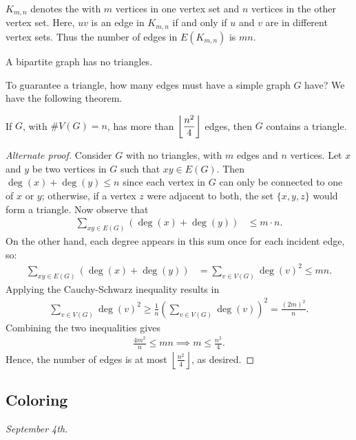 $K_{m,n}$ denotes the  with $m$ vertices in one vertex set and $n$ vertices in the other vertex set. Here, $uv$ is an edge in $K_{m,n}$ if and only if $u$ and $v$ are in different vertex sets. Thus the number of edges in $E(K_{m,n})$ is $mn$.

\begin{corollary}
    A bipartite graph has no triangles.
\end{corollary}

To guarantee a triangle, how many edges must have a simple graph $G$ have? We have the following theorem.

\begin{theorem}
    If $G$, with $\#V(G) = n$, has more than $\left\lfloor \dfrac{n^{2}}{4} \right\rfloor$ edges, then $G$ contains a triangle.
\end{theorem}

\begin{proof}[Alternate proof]
    Consider $G$ with no triangles, with $m$ edges and $n$ vertices. Let $x$ and $y$ be two vertices in $G$ such that $xy \in E(G)$. Then $\deg(x) + \deg(y) \leq n$ since each vertex in $G$ can only be connected to one of $x$ or $y$; otherwise, if a vertex $z$ were adjacent to both, the set $\{x, y, z\}$ would form a triangle. Now observe that
    \begin{align}
        \sum_{xy \in E(G)} \left( \deg(x) + \deg(y) \right) &\leq m \cdot n.
    \end{align}
    On the other hand, each degree appears in this sum once for each incident edge, so:
    \begin{align}
        \sum_{xy \in E(G)} \left( \deg(x) + \deg(y) \right) &= \sum_{v \in V(G)} \deg(v)^2 \leq mn.
    \end{align}
    Applying the Cauchy-Schwarz inequality results in
    \begin{align}
        \sum_{v \in V(G)} \deg(v)^2 \geq \frac{1}{n} \left( \sum_{v \in V(G)} \deg(v) \right)^2 = \frac{(2m)^2}{n}.
    \end{align}
    Combining the two inequalities gives
    \begin{align}
        \frac{4m^2}{n} \leq m n \implies m \leq \frac{n^2}{4}.
    \end{align}
    Hence, the number of edges is at most $\left\lfloor \frac{n^2}{4} \right\rfloor$, as desired.
\end{proof}

\subsection{Coloring}
\textit{September 4th.}

